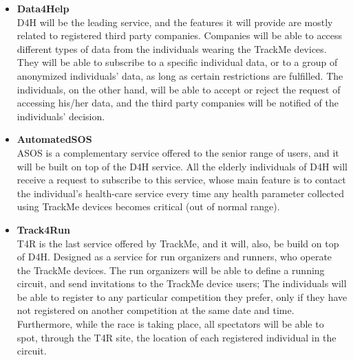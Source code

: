\documentclass[hidelinks, 12pt]{report}
\begin{document}
	\begin{itemize}
		\item{\textbf{Data4Help}}
		\\D4H will be the leading service, and the features it will provide are mostly related to registered third party companies. Companies will be able to access different types of data from the individuals wearing the TrackMe devices. They will be able to subscribe to a specific individual data, or to a group of anonymized individuals' data, as long as certain restrictions are fulfilled. The individuals, on the other hand, will be able to accept or reject the request of accessing his/her data, and the third party companies will be notified of the individuals' decision.
		
		\item{\textbf{AutomatedSOS}}
		\\ ASOS is a complementary service offered to the senior range of users, and it will be built on top of the D4H service. All the elderly individuals of D4H will receive a request to subscribe to this service, whose main feature is to contact the individual's health-care service every time any health parameter collected using TrackMe devices becomes critical (out of normal range).
		
		\item{\textbf{Track4Run}}
		\\T4R is the last service offered by TrackMe, and it will, also, be build on top of D4H. Designed as a service for run organizers and runners, who operate the TrackMe devices. The run organizers will be able to define a running circuit, and send invitations to the TrackMe device users; The individuals will be able to register to any particular competition they prefer, only if they have not registered on another competition at the same date and time. Furthermore, while the race is taking place, all spectators will be able to spot, through the T4R site, the location of each registered individual in the circuit.
	\end{itemize}
	
\end{document}
